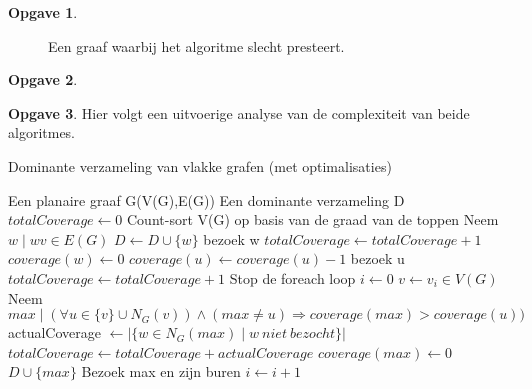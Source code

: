 \documentclass[11pt, a4paper, table]{article}
\makeatletter
\newenvironment{algoritme}[1][H]{%
	\renewcommand{\ALG@name}{Algoritme}%
	\renewcommand{\algorithmicrequire}{\textbf{Input:}}
	\renewcommand{\algorithmicensure}{\textbf{Output:}}
	\begin{algorithm}[#1]%
	}{\end{algorithm}}
\theoremstyle{definition}
\newtheorem{opgave}{Opgave}
\theoremstyle{definition}
\theoremstyle{definition}
\makeatother
\begin{document}
\begin{opgave}
\begin{figure}[H]
		\caption{Een graaf waarbij het algoritme slecht presteert.}
		\label{fig:worstcase}
	\end{figure}
\end{opgave}
\begin{opgave}
\end{opgave}
\begin{opgave}
		Hier volgt een uitvoerige analyse van de complexiteit van beide algoritmes. 
		\begin{tcolorbox}[blanker,float=tbp, grow to left by=2cm,grow to right by=2cm]
		\begin{algoritme}
			\caption{Dominante verzameling van vlakke grafen (met optimalisaties)}
			\label{alg:dominance}
			\begin{algorithmic}[1]
				\Require Een planaire graaf G(V(G),E(G))
				\Ensure Een dominante verzameling D
				\State $totalCoverage \gets 0$
				\State Count-sort V(G) op basis van de graad van de toppen\label{sortoperation}
				\label{startoptimalizationloop1}
					\State Neem $w \mid wv \in E(G)$
						\State $D \gets D \cup \{w\}$
						\State bezoek w 
						\State $totalCoverage \gets totalCoverage+1$
						\State $coverage(w) \gets 0$
					\EndIf 
						\State $coverage(u) \gets coverage(u) - 1$
							\State bezoek u
							\State $totalCoverage \gets totalCoverage + 1 $
						\EndIf
					\EndFor
						\State Stop de foreach loop
					\EndIf 
				\EndFor\label{endoptimalizationloop1}
				 \label{startoptimalizationloop2}
					\State $i \gets 0$
					\label{startactualalgorithmloop}
					\State $v \gets v_i \in V(G)$
							\State Neem $max \mid (\forall u \in \{v\} \cup N_G(v)) \land (max \ne u) \Rightarrow coverage(max)>coverage(u))$ \label{neighbourloop1}
								\State actualCoverage $\gets \vert\{w \in N_G(max) \mid w\ niet \  bezocht\}\vert $ \label{neighbourloop2}
									\State $totalCoverage \gets totalCoverage + actualCoverage$
									\State $coverage(max)  \gets 0$
									\State $ D \cup \{max\}$
									\State Bezoek max en zijn buren\label{neighbourloop3}
								\EndIf 
							\EndIf
						\EndIf
						\State $i \gets i+1$
					\EndWhile\label{endactualalgorithmloop}
				\EndFor\label{endoptimalizationloop2}
				

\end{algorithmic}
\end{algoritme}
\end{tcolorbox}
\end{opgave}
\end{document}

